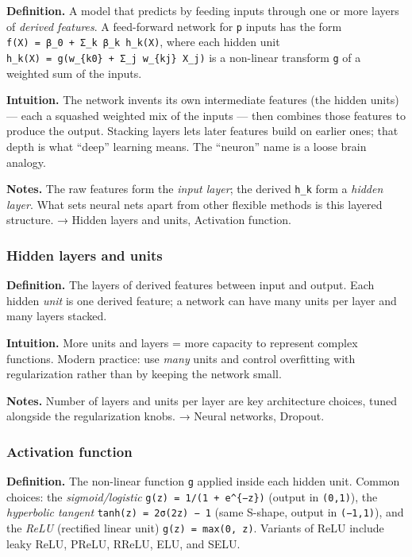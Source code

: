 \documentclass[
  10pt,
  letterpaper,
  onecolumn]{article}
\begin{document}
\textbf{Definition.} A model that predicts by feeding inputs through one
or more layers of \emph{derived features}. A feed-forward network for
\texttt{p} inputs has the form
\texttt{f(X)\ =\ β\_0\ +\ Σ\_k\ β\_k\ h\_k(X)}, where each hidden unit
\texttt{h\_k(X)\ =\ g(w\_\{k0\}\ +\ Σ\_j\ w\_\{kj\}\ X\_j)} is a
non-linear transform \texttt{g} of a weighted sum of the inputs.

\textbf{Intuition.} The network invents its own intermediate features
(the hidden units) --- each a squashed weighted mix of the inputs ---
then combines those features to produce the output. Stacking layers lets
later features build on earlier ones; that depth is what ``deep''
learning means. The ``neuron'' name is a loose brain analogy.

\textbf{Notes.} The raw features form the \emph{input layer}; the
derived \texttt{h\_k} form a \emph{hidden layer}. What sets neural nets
apart from other flexible methods is this layered structure. → Hidden
layers and units, Activation function.

\hypertarget{hidden-layers-and-units}{%
\subsubsection{Hidden layers and units}\label{hidden-layers-and-units}}

\textbf{Definition.} The layers of derived features between input and
output. Each hidden \emph{unit} is one derived feature; a network can
have many units per layer and many layers stacked.

\textbf{Intuition.} More units and layers = more capacity to represent
complex functions. Modern practice: use \emph{many} units and control
overfitting with regularization rather than by keeping the network
small.

\textbf{Notes.} Number of layers and units per layer are key
architecture choices, tuned alongside the regularization knobs. → Neural
networks, Dropout.

\hypertarget{activation-function}{%
\subsubsection{Activation function}\label{activation-function}}

\textbf{Definition.} The non-linear function \texttt{g} applied inside
each hidden unit. Common choices: the \emph{sigmoid/logistic}
\texttt{g(z)\ =\ 1/(1\ +\ e\^{}\{−z\})} (output in \texttt{(0,1)}), the
\emph{hyperbolic tangent} \texttt{tanh(z)\ =\ 2σ(2z)\ −\ 1} (same
S-shape, output in \texttt{(−1,1)}), and the \emph{ReLU} (rectified
linear unit) \texttt{g(z)\ =\ max(0,\ z)}. Variants of ReLU include
leaky ReLU, PReLU, RReLU, ELU, and SELU.
\end{document}
